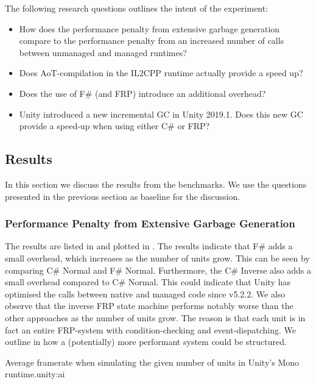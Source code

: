 The following research questions outlines the intent of the experiment:
\begin{itemize}
    \item How does the performance penalty from extensive garbage generation compare to the performance penalty from an increased number of calls between unmanaged and managed runtimes?
    \item Does \gls{AoT}-compilation in the IL2CPP runtime actually provide a speed up?
    \item Does the use of F\# (and \gls{FRP}) introduce an additional overhead?
    \item Unity introduced a new incremental \gls{GC} in Unity 2019.1. Does this new \gls{GC} provide a speed-up when using either C\# or \gls{FRP}?
\end{itemize}

\subsection{Results}\label{sec:unity-garbage-res}
In this section we discuss the results from the benchmarks. We use the questions presented in the previous section as baseline for the discussion.

\subsubsection{Performance Penalty from Extensive Garbage Generation}
The results are listed in  and plotted in . The results indicate that F\# adds a small overhead, which increases as the number of units grow. This can be seen by comparing C\# Normal and F\# Normal. Furthermore, the C\# Inverse also adds a small overhead compared to C\# Normal. This could indicate that Unity has optimised the calls between native and managed code since v5.2.2. We also observe that the inverse \gls{FRP} state machine performs notably worse than the other approaches as the number of units grow. The reason is that each unit is in fact an entire \gls{FRP}-system with condition-checking and event-dispatching. We outline in  how a (potentially) more performant system could be structured.

%
{Average framerate when simulating the given number of units in Unity's Mono runtime.}{unity:ai}%

